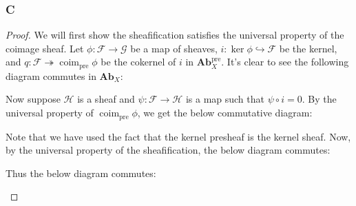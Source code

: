 \documentclass{article}
\newcommand{\fF}{\mathscr{F}}
\newcommand{\fG}{\mathscr{G}}
\newcommand{\fH}{\mathscr{H}}
\newcommand{\Ab}{\mathbf{Ab}} %
\DeclareMathOperator{\pre}{\mathrm{pre}}
\DeclareMathOperator{\coim}{\mathrm{coim}}
\DeclareMathOperator{\sh}{sh}
\begin{document}
\subsubsection{C}\label{2.6.C}
\begin{proof}
    We will first show the sheafification satisfies the universal property of the coimage sheaf. Let $\phi:\fF\to \fG$ be a map of sheaves, $i:\ker \phi \hookrightarrow \fF$ be the kernel, and $q:\fF\twoheadrightarrow \coim_{\pre} \phi$ be the cokernel of $i$ in $\Ab_X^{\pre}$. It's clear to see the following diagram commutes in $\Ab_X$:
    \begin{center}
    \end{center}
    Now suppose $\fH$ is a sheaf and $\psi:\fF\to \fH$ is a map such that $\psi \circ i=0$. By the universal property of $\coim_{\pre} \phi$, we get the below commutative diagram:
    \begin{center}
    \end{center}
    Note that we have used the fact that the kernel presheaf is the kernel sheaf. Now, by the universal property of the sheafification, the below diagram commutes:
    \begin{center}
    \end{center}
    Thus the below diagram commutes:
    \begin{center}
\end{center}
\end{proof}
\end{document}
